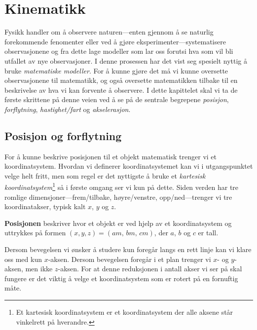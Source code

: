\chapter{Kinematikk}

Fysikk handler om å observere naturen---enten gjennom å se naturlig forekommende fenomenter eller ved å gjøre eksperimenter---systematisere observasjonene og fra dette lage modeller som lar oss forutsi hva som vil bli utfallet av nye observasjoner. I denne prosessen har det vist seg spesielt nyttig å bruke \emph{matematiske modeller}. For å kunne gjøre det må vi kunne oversette observasjonene til matematikk, og også oversette matematikken tilbake til en beskrivelse av hva vi kan forvente å observere. I dette kapittelet skal vi ta de første skrittene på denne veien ved å se på de sentrale begrepene \emph{posisjon}, \emph{forflytning}, \emph{hastighet/fart} og \emph{akselerasjon}.

\section{Posisjon og forflytning}
For å kunne beskrive posisjonen til et objekt matematisk trenger vi et koordinatsystem. Hvordan vi definerer koordinatsystemet kan vi i utgangspunktet velge helt fritt, men som regel er det nyttigste å bruke et  \emph{kartesisk koordinatsystem}\footnote{Et kartesisk koordinatsystem er et koordinatsystem der alle aksene står vinkelrett på hverandre.} så i første omgang ser vi kun på dette. Siden verden har tre romlige dimensjoner---frem/tilbake, høyre/venstre, opp/ned---trenger vi tre koordinatakser, typisk kalt $x$, $y$ og $z$. 

\begin{tdef}
{\bf Posisjonen} beskriver hvor et objekt er ved hjelp av et koordinatsystem og uttrykkes på formen $(x, y, z) = (a\unit{m},\, b\unit{m},\, c\unit{m})$, der $a$, $b$ og $c$ er tall.  
\end{tdef}

Dersom bevegelsen vi ønsker å studere kun foregår langs en rett linje kan vi klare oss med kun $x$-aksen. Dersom bevegelsen foregår i et plan trenger vi $x$- og $y$-aksen, men ikke $z$-aksen.  For at denne reduksjonen i antall akser vi ser på skal fungere er det viktig å velge et koordinatsystem som er rotert på en fornuftig måte.

